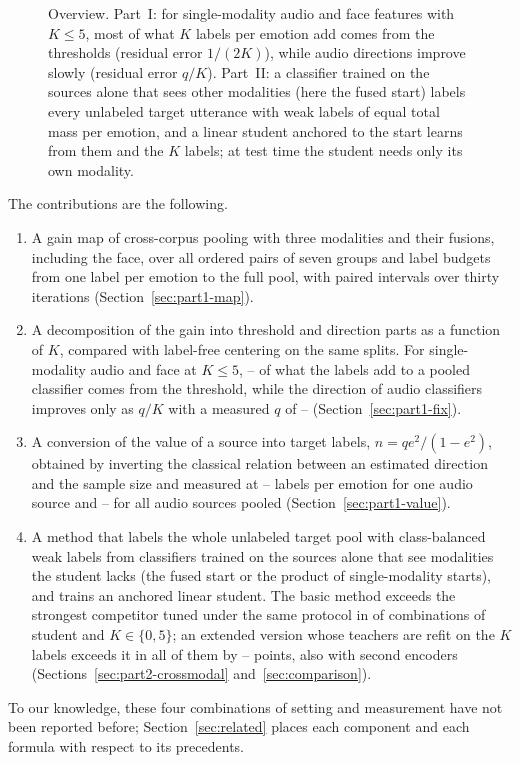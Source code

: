 \begin{figure}[t]
\centering
{}
\caption{Overview. Part~I: for single-modality audio and face features with $K \le 5$, most of what $K$ labels per emotion add comes from the thresholds (residual error $1/(2K)$), while audio directions improve slowly (residual error $q/K$). Part~II: a classifier trained on the sources alone that sees other modalities (here the fused start) labels every unlabeled target utterance with weak labels of equal total mass per emotion, and a linear student anchored to the start learns from them and the $K$ labels; at test time the student needs only its own modality.}
\label{fig:overview}
\end{figure}

The contributions are the following.
\begin{enumerate}
\item A gain map of cross-corpus pooling with three modalities and their fusions, including the face, over all ordered pairs of seven groups and label budgets from one label per emotion to the full pool, with paired intervals over thirty iterations (Section~\ref{sec:part1-map}).
\item A decomposition of the gain into threshold and direction parts as a function of $K$, compared with label-free centering on the same splits. For single-modality audio and face at $K \le 5$, -- of what the labels add to a pooled classifier comes from the threshold, while the direction of audio classifiers improves only as $q/K$ with a measured $q$ of -- (Section~\ref{sec:part1-fix}).
\item A conversion of the value of a source into target labels, $n = q e^2/(1-e^2)$, obtained by inverting the classical relation between an estimated direction and the sample size and measured at -- labels per emotion for one audio source and -- for all audio sources pooled (Section~\ref{sec:part1-value}).
\item A method that labels the whole unlabeled target pool with class-balanced weak labels from classifiers trained on the sources alone that see modalities the student lacks (the fused start or the product of single-modality starts), and trains an anchored linear student. The basic method exceeds the strongest competitor tuned under the same protocol in  of  combinations of student and $K \in \{0, 5\}$; an extended version whose teachers are refit on the $K$ labels exceeds it in all of them by -- points, also with second encoders (Sections~\ref{sec:part2-crossmodal} and~\ref{sec:comparison}).
\end{enumerate}
To our knowledge, these four combinations of setting and measurement have not been reported before; Section~\ref{sec:related} places each component and each formula with respect to its precedents.
